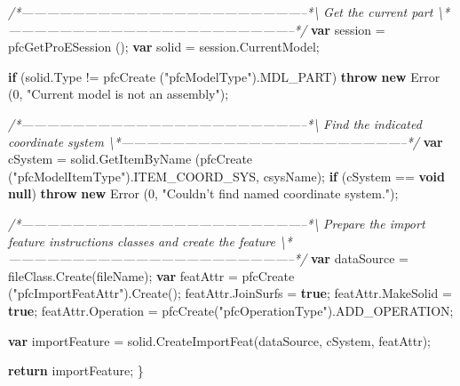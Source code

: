 \documentclass[]{article}
\newenvironment{Shaded}{}{}
\newcommand{\KeywordTok}[1]{\textcolor[rgb]{0.00,0.44,0.13}{\textbf{{#1}}}}
\newcommand{\DecValTok}[1]{\textcolor[rgb]{0.25,0.63,0.44}{{#1}}}
\newcommand{\StringTok}[1]{\textcolor[rgb]{0.25,0.44,0.63}{{#1}}}
\newcommand{\CommentTok}[1]{\textcolor[rgb]{0.38,0.63,0.69}{\textit{{#1}}}}
\newcommand{\OtherTok}[1]{\textcolor[rgb]{0.00,0.44,0.13}{{#1}}}
\newcommand{\FunctionTok}[1]{\textcolor[rgb]{0.02,0.16,0.49}{{#1}}}
\newcommand{\NormalTok}[1]{{#1}}
\begin{document}
\begin{Shaded}
\begin{Highlighting}[]
\CommentTok{/*--------------------------------------------------------------------*\textbackslash{} }
\CommentTok{  Get the current part }
\CommentTok{\textbackslash{}*--------------------------------------------------------------------*/}  
  \KeywordTok{var} \NormalTok{session = }\FunctionTok{pfcGetProESession} \NormalTok{();}
  \KeywordTok{var} \NormalTok{solid = }\OtherTok{session}\NormalTok{.}\FunctionTok{CurrentModel}\NormalTok{;}
  
  \KeywordTok{if} \NormalTok{(}\OtherTok{solid}\NormalTok{.}\FunctionTok{Type} \NormalTok{!= }\FunctionTok{pfcCreate} \NormalTok{(}\StringTok{"pfcModelType"}\NormalTok{).}\FunctionTok{MDL_PART}\NormalTok{)}
    \KeywordTok{throw} \KeywordTok{new} \FunctionTok{Error} \NormalTok{(}\DecValTok{0}\NormalTok{, }\StringTok{"Current model is not an assembly"}\NormalTok{);}

\CommentTok{/*--------------------------------------------------------------------*\textbackslash{} }
\CommentTok{  Find the indicated coordinate system}
\CommentTok{\textbackslash{}*--------------------------------------------------------------------*/} 
  \KeywordTok{var} \NormalTok{cSystem = }\OtherTok{solid}\NormalTok{.}\FunctionTok{GetItemByName} \NormalTok{(}\FunctionTok{pfcCreate} \NormalTok{(}\StringTok{"pfcModelItemType"}\NormalTok{).}\FunctionTok{ITEM_COORD_SYS}\NormalTok{, }
                     \NormalTok{csysName);}
  \KeywordTok{if} \NormalTok{(cSystem == }\KeywordTok{void} \KeywordTok{null}\NormalTok{)}
    \KeywordTok{throw} \KeywordTok{new} \FunctionTok{Error} \NormalTok{(}\DecValTok{0}\NormalTok{, }\StringTok{"Couldn't find named coordinate system."}\NormalTok{);}

\CommentTok{/*--------------------------------------------------------------------*\textbackslash{} }
\CommentTok{  Prepare the import feature instructions classes and create the feature}
\CommentTok{\textbackslash{}*--------------------------------------------------------------------*/} 
  \KeywordTok{var} \NormalTok{dataSource = }\OtherTok{fileClass}\NormalTok{.}\FunctionTok{Create}\NormalTok{(fileName);}
  \KeywordTok{var} \NormalTok{featAttr = }\FunctionTok{pfcCreate} \NormalTok{(}\StringTok{"pfcImportFeatAttr"}\NormalTok{).}\FunctionTok{Create}\NormalTok{();}
  \OtherTok{featAttr}\NormalTok{.}\FunctionTok{JoinSurfs} \NormalTok{= }\KeywordTok{true}\NormalTok{;}
  \OtherTok{featAttr}\NormalTok{.}\FunctionTok{MakeSolid} \NormalTok{= }\KeywordTok{true}\NormalTok{;}
  \OtherTok{featAttr}\NormalTok{.}\FunctionTok{Operation} \NormalTok{= }\FunctionTok{pfcCreate}\NormalTok{(}\StringTok{"pfcOperationType"}\NormalTok{).}\FunctionTok{ADD_OPERATION}\NormalTok{;}
  
  \KeywordTok{var} \NormalTok{importFeature = }\OtherTok{solid}\NormalTok{.}\FunctionTok{CreateImportFeat}\NormalTok{(dataSource, cSystem, featAttr);}
  
  \KeywordTok{return} \NormalTok{importFeature;}
\NormalTok{\}}

\end{Highlighting}
\end{Shaded}
\end{document}
